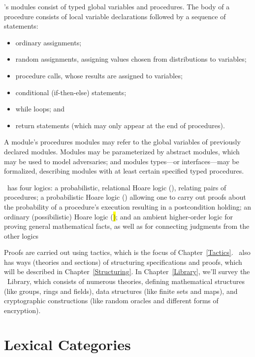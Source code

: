 \EasyCrypt's modules consist of typed global variables and procedures.
The body of a procedure consists of local variable declarations followed
by a sequence of statements:
\begin{itemize}
\item ordinary assignments;

\item random assignments, assigning values chosen
  from distributions to variables;

\item procedure calls, whose results are assigned to variables;

\item conditional (if-then-else) statements;

\item while loops; and

\item return statements (which may only appear at the end of
  procedures).
\end{itemize}
A module's procedures modules may refer to the global variables of
previously declared modules. Modules may be parameterized by abstract
modules, which may be used to model adversaries; and modules
types---or interfaces---may be formalized, describing modules with at
least certain specified typed procedures.

\EasyCrypt\ has four logics: a probabilistic, relational Hoare logic
(\prhl), relating pairs of procedures; a probabilistic Hoare logic
(\phl) allowing one to carry out proofs about the probability of a
procedure's execution resulting in a postcondition holding; an
ordinary (possibilistic) Hoare logic (\hl); and an ambient
higher-order logic for proving general mathematical facts, as well as
for connecting judgments from the other logics

Proofs are carried out using tactics, which is the focus of
Chapter~\ref{Tactics}.  \EasyCrypt\ also has ways (theories and
sections) of structuring specifications and proofs, which will be
described in Chapter~\ref{Structuring}. In Chapter~\ref{Library},
we'll survey the \EasyCrypt\ Library, which consists of numerous
theories, defining mathematical structures (like groups, rings
and fields), data structures (like finite sets and maps), and
cryptographic constructions (like random oracles and different
forms of encryption).

\section{Lexical Categories}
\label{Lexical}

